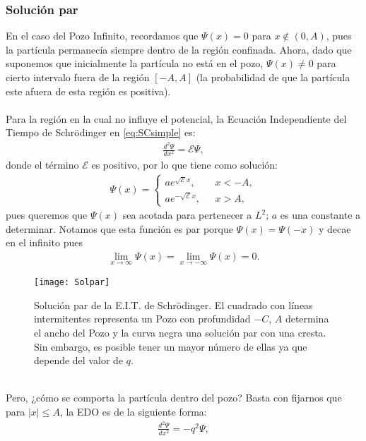 \documentclass[12pt]{article}
\theoremstyle{definition}
\begin{document}
\subsubsection{Solución par}
\noindent
 En el caso del Pozo Infinito, recordamos que $\Psi(x) = 0$ para $x \notin (0,A)$, pues la partícula permanecía siempre dentro de la región confinada. Ahora, dado que suponemos que inicialmente la partícula no está en el pozo, $\Psi(x)\neq 0$ para cierto intervalo fuera de la región $[-A,A]$ (la probabilidad de que la partícula este afuera de esta región es positiva).
 \\ \\
 Para la región en la cual no influye el potencial, la Ecuación Independiente del Tiempo de Schrödinger en \eqref{eq:SCsimple} es:
 \begin{align*}
     \frac{d^2\Psi}{dx^2} = \mathcal{E}\Psi,
 \end{align*}
 donde el término $\mathcal{E}$ es positivo, por lo que tiene como solución:
\begin{align*}
        \Psi(x) = 
        \left\{ \begin{array}{ll}
        ae^{\sqrt{\mathcal{E}}x},& \:\:\:  x < -A,
        \\
        ae^{-\sqrt{\mathcal{E}}x},& \:\:\: x > A,
        \end{array}
        \right.
\end{align*}
pues queremos que $\Psi(x)$ sea acotada para pertenecer a $L^2$; $a$ es una constante a determinar. Notamos que esta función es par porque $\Psi(x) = \Psi(-x)$ y decae en el infinito pues
\begin{align*}
    \lim_{x\to\infty} \Psi(x) = \lim_{x\to -\infty} \Psi(x) = 0.
\end{align*}
\begin{figure}[h]
    \centering
    \texttt{[image: Solpar]}
    \caption{Solución par de la E.I.T. de Schrödinger. El cuadrado con líneas intermitentes representa un Pozo con profundidad $-C$, $A$ determina el ancho del Pozo y la curva negra una solución par con una cresta. Sin embargo, es posible tener un mayor número de ellas ya que depende del valor de $q$.}
    \label{fig:Solpar}
\end{figure}
\\
Pero, ¿cómo se comporta la partícula dentro del pozo? Basta con fijarnos que para $|x|\leq A$, la EDO es de la siguiente forma:
\begin{align}
    \frac{d^2\Psi}{dx^2} = -q^2\Psi,
    \label{eq:EDOseg}
\end{align}
\end{document}
